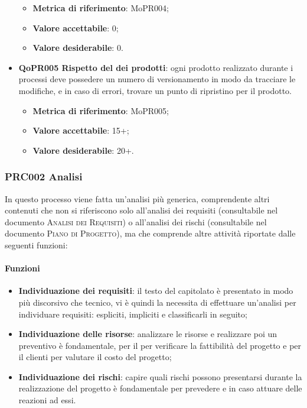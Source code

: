 \documentclass[../piano-di-qualifica.tex]{subfiles}
\begin{document}
\begin{itemize}
        \begin{itemize}
            \item \textbf{Metrica di riferimento}: MoPR004;
            \item \textbf{Valore accettabile}: 0; %
            \item \textbf{Valore desiderabile}: 0.
        \end{itemize}
    \item \textbf{QoPR005 Rispetto del  dei prodotti}: ogni prodotto realizzato durante i processi deve possedere un numero di versionamento in modo da tracciare le modifiche, e in caso di errori, trovare un punto di ripristino per il prodotto.
        \begin{itemize}
            \item \textbf{Metrica di riferimento}: MoPR005;
            \item \textbf{Valore accettabile}: 15+; %
            \item \textbf{Valore desiderabile}: 20+.
        \end{itemize}
\end{itemize}

\subsubsection{PRC002 Analisi}
\label{sub:analisi}
In questo processo viene fatta un'analisi più generica, comprendente altri contenuti che non si riferiscono solo all'analisi dei requisiti (consultabile nel documento \textsc{Analisi dei Requisiti}) o all'analisi dei rischi (consultabile nel documento \textsc{Piano di Progetto}), ma che comprende altre attività riportate dalle seguenti funzioni:

\paragraph{Funzioni}
\label{sub:funzioni_2}
\begin{itemize}
    \item \textbf{Individuazione dei requisiti}: il testo del capitolato è presentato in modo più discorsivo che tecnico, vi è quindi la necessita di effettuare un'analisi per individuare requisiti: espliciti, impliciti e classificarli in seguito;
    \item \textbf{Individuazione delle risorse}: analizzare le risorse e realizzare poi un preventivo è fondamentale, per il  per verificare la fattibilità del progetto e per il clienti per valutare il costo del progetto;
    \item \textbf{Individuazione dei rischi}: capire quali rischi possono presentarsi durante la realizzazione del progetto è fondamentale per prevedere e in caso attuare delle reazioni ad essi.
\end{itemize}
\end{document}
